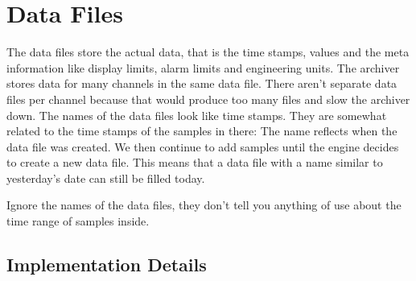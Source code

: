 \section{Data Files} \label{sec:dataFileFormat}
The data files store the actual data, that is the time stamps, values
and the meta information like display limits, alarm limits and
engineering units. 
The archiver stores data for many channels in the same data
file. There aren't separate data files per channel because that would
produce too many files and slow the archiver down.  The names of the
data files look like time stamps. They are somewhat related to the
time stamps of the samples in there: The name reflects when the data
file was created. We then continue to add samples until the engine
decides to create a new data file. This means that a data file with a
name similar to yesterday's date can still be filled today.

 Ignore the names of the data files,
they don't tell you anything of use about the time range of samples
inside.

\subsection{Implementation Details}

